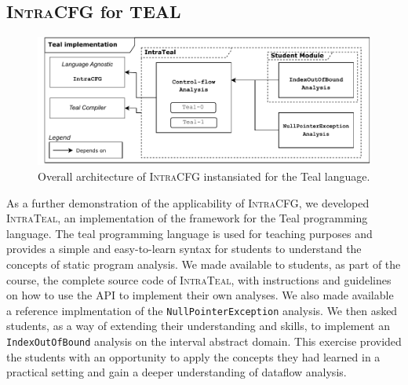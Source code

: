 \subsection{\textsc{IntraCFG} for TEAL}
\begin{figure}[H]
    \centering
    \includegraphics[scale=0.65]{kappa/img/architectureteal.pdf}
    \caption{\label{fig:IntraTeal} Overall architecture of \textsc{IntraCFG} instansiated for the Teal language.}
\end{figure}
As a further demonstration of the applicability of \textsc{IntraCFG},
we developed \textsc{IntraTeal}, an implementation of the framework for the Teal programming language.
The teal programming language is used for teaching purposes 
and provides a simple and easy-to-learn syntax for students to understand the 
concepts of static program analysis.
We made available to students, as part of the course, the complete source code of \textsc{IntraTeal}, 
with instructions and guidelines on how to use the API to implement their own analyses.
We also made available a reference implmentation of the 
\texttt{NullPointerException} analysis. We then asked students, as a way of 
extending their understanding and skills, to implement an \texttt{IndexOutOfBound} 
analysis on the interval abstract domain. This exercise provided the 
students with an opportunity to apply the concepts they had learned in a practical 
setting and gain a deeper understanding of dataflow analysis.

